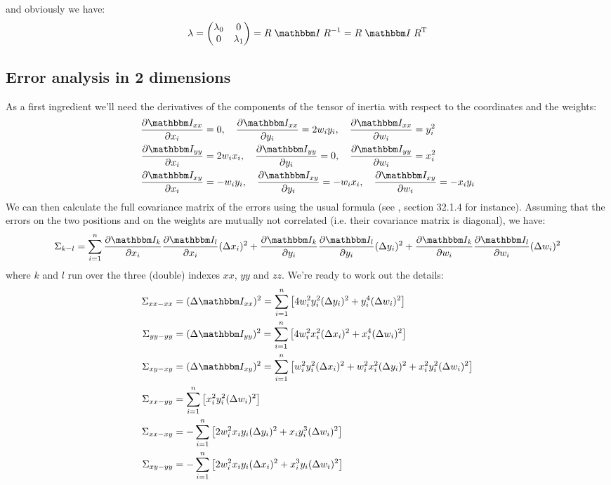 \documentclass[a4paper,11pt]{article}
\newcommand{\pder}[2]{\frac{\partial#1}{\partial#2}}
\newcommand{\itm}{\mathbbm I}
\newcommand{\itc}[1]{\itm_{#1}}
\begin{document}
and obviously we have:
\begin{equation}\label{eq:rotation}
  \lambda = 
  \begin{pmatrix}
    \lambda_0 & 0\\
    0 & \lambda_1
  \end{pmatrix} = R\;\itm\;R^{-1} = R\;\itm\;R^{\rm T}
\end{equation}


\subsection{Error analysis in 2 dimensions}

As a first ingredient we'll need the derivatives of the components of the
tensor of inertia with respect to the coordinates and the weights:
\begin{align}
\pder{\itc{xx}}{x_i} &= 0,\quad
\pder{\itc{xx}}{y_i}  = 2w_iy_i,\quad
\pder{\itc{xx}}{w_i}  = y_i^2\\
\pder{\itc{yy}}{x_i} &= 2w_ix_i,\quad
\pder{\itc{yy}}{y_i}  = 0,\quad
\pder{\itc{yy}}{w_i}  = x_i^2\\
\pder{\itc{xy}}{x_i} &= -w_iy_i,\quad
\pder{\itc{xy}}{y_i}  = -w_ix_i,\quad
\pder{\itc{xy}}{w_i}  = -x_iy_i
\end{align}
We can then calculate the full covariance matrix of the errors using the
usual formula (see \cite{pdg}, section 32.1.4 for instance). Assuming that
the errors on the two positions and on the weights are mutually not correlated
(i.e. their covariance matrix is diagonal), we have:
\begin{equation}
  \Sigma_{k-l} = \sum_{i=1}^n 
  \pder{\itc{k}}{x_i}\pder{\itc{l}}{x_i}(\Delta x_i)^2 +
  \pder{\itc{k}}{y_i}\pder{\itc{l}}{y_i}(\Delta y_i)^2 +
  \pder{\itc{k}}{w_i}\pder{\itc{l}}{w_i}(\Delta w_i)^2
\end{equation}
where $k$ and $l$ run over the three (double) indexes $xx$, $yy$ and $zz$.
We're ready to work out the details:
\begin{align}
  \Sigma_{xx-xx} &= (\Delta\itc{xx})^2 =
  \sum_{i=1}^n \left[4w^2_iy^2_i(\Delta y_i)^2 + y_i^4(\Delta w_i)^2\right]\\
  \Sigma_{yy-yy} &= (\Delta\itc{yy})^2 =
  \sum_{i=1}^n \left[4w^2_ix^2_i(\Delta x_i)^2 + x_i^4(\Delta w_i)^2\right]\\
  \Sigma_{xy-xy} &= (\Delta\itc{xy})^2 =
  \sum_{i=1}^n \left[w_i^2y_i^2(\Delta x_i)^2 + w_i^2x_i^2(\Delta y_i)^2 +
    x_i^2y_i^2(\Delta w_i)^2 \right]\\
  \Sigma_{xx-yy} &= 
  \sum_{i=1}^n \left[ x_i^2y_i^2 (\Delta w_i)^2\right]\\
  \Sigma_{xx-xy} &= 
  -\sum_{i=1}^n \left[ 2w_i^2x_iy_i(\Delta y_i)^2 +
    x_iy_i^3(\Delta w_i)^2 \right]\\
  \Sigma_{xy-yy} &= 
  -\sum_{i=1}^n \left[ 2w_i^2x_iy_i(\Delta x_i)^2 +
    x_i^3y_i(\Delta w_i)^2 \right]
\end{align}
\end{document}
